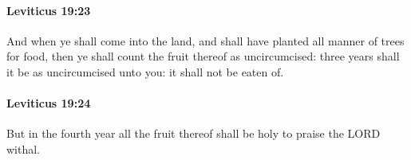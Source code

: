 		\paragraph{Leviticus 19:23} %
			\label{LEVITICUS-19-23}

			And when ye shall come into the land, and shall have planted all manner of trees for food, then ye shall count the fruit thereof as uncircumcised: three years shall it be as uncircumcised unto you: it shall not be eaten of.


		\paragraph{Leviticus 19:24} %
			\label{LEVITICUS-19-24}

			But in the fourth year all the fruit thereof shall be holy to praise the LORD withal.


